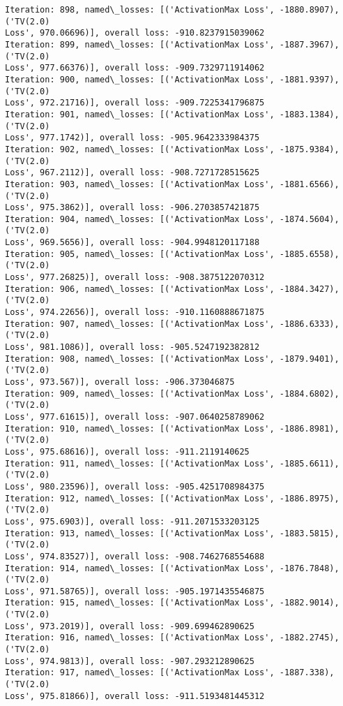 \documentclass[10pt]{article}
\begin{document}
\begin{Verbatim}[commandchars=\\\{\}]
Iteration: 898, named\_losses: [('ActivationMax Loss', -1880.8907), ('TV(2.0)
Loss', 970.06696)], overall loss: -910.8237915039062
Iteration: 899, named\_losses: [('ActivationMax Loss', -1887.3967), ('TV(2.0)
Loss', 977.66376)], overall loss: -909.7329711914062
Iteration: 900, named\_losses: [('ActivationMax Loss', -1881.9397), ('TV(2.0)
Loss', 972.21716)], overall loss: -909.7225341796875
Iteration: 901, named\_losses: [('ActivationMax Loss', -1883.1384), ('TV(2.0)
Loss', 977.1742)], overall loss: -905.9642333984375
Iteration: 902, named\_losses: [('ActivationMax Loss', -1875.9384), ('TV(2.0)
Loss', 967.2112)], overall loss: -908.7271728515625
Iteration: 903, named\_losses: [('ActivationMax Loss', -1881.6566), ('TV(2.0)
Loss', 975.3862)], overall loss: -906.2703857421875
Iteration: 904, named\_losses: [('ActivationMax Loss', -1874.5604), ('TV(2.0)
Loss', 969.5656)], overall loss: -904.9948120117188
Iteration: 905, named\_losses: [('ActivationMax Loss', -1885.6558), ('TV(2.0)
Loss', 977.26825)], overall loss: -908.3875122070312
Iteration: 906, named\_losses: [('ActivationMax Loss', -1884.3427), ('TV(2.0)
Loss', 974.22656)], overall loss: -910.1160888671875
Iteration: 907, named\_losses: [('ActivationMax Loss', -1886.6333), ('TV(2.0)
Loss', 981.1086)], overall loss: -905.5247192382812
Iteration: 908, named\_losses: [('ActivationMax Loss', -1879.9401), ('TV(2.0)
Loss', 973.567)], overall loss: -906.373046875
Iteration: 909, named\_losses: [('ActivationMax Loss', -1884.6802), ('TV(2.0)
Loss', 977.61615)], overall loss: -907.0640258789062
Iteration: 910, named\_losses: [('ActivationMax Loss', -1886.8981), ('TV(2.0)
Loss', 975.68616)], overall loss: -911.2119140625
Iteration: 911, named\_losses: [('ActivationMax Loss', -1885.6611), ('TV(2.0)
Loss', 980.23596)], overall loss: -905.4251708984375
Iteration: 912, named\_losses: [('ActivationMax Loss', -1886.8975), ('TV(2.0)
Loss', 975.6903)], overall loss: -911.2071533203125
Iteration: 913, named\_losses: [('ActivationMax Loss', -1883.5815), ('TV(2.0)
Loss', 974.83527)], overall loss: -908.7462768554688
Iteration: 914, named\_losses: [('ActivationMax Loss', -1876.7848), ('TV(2.0)
Loss', 971.58765)], overall loss: -905.1971435546875
Iteration: 915, named\_losses: [('ActivationMax Loss', -1882.9014), ('TV(2.0)
Loss', 973.2019)], overall loss: -909.699462890625
Iteration: 916, named\_losses: [('ActivationMax Loss', -1882.2745), ('TV(2.0)
Loss', 974.9813)], overall loss: -907.293212890625
Iteration: 917, named\_losses: [('ActivationMax Loss', -1887.338), ('TV(2.0)
Loss', 975.81866)], overall loss: -911.5193481445312

\end{Verbatim}
\end{document}
